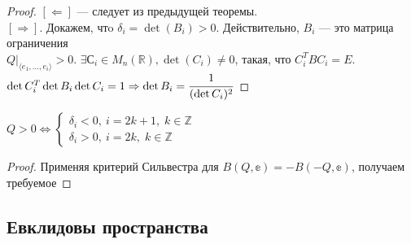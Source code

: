 \begin{proof}
	$[\Leftarrow]$ --- следует из предыдущей теоремы. \\
	$[\Rightarrow]$. Докажем, чтo $\delta_i = \det(B_i) > 0$. Действительно, $B_i$ --- это матрица ограничения\\ $Q\bigr|_{\langle e_1, \ldots, e_i\rangle} > 0$. $\exists С_i \in M_n(\mathbb{R}), \det(C_i) \neq 0$, такая, что $C_i^TBC_i = E$. \\
	$\det C^T_i\det B_i \det C_i = 1 \Rightarrow \det B_i = \cfrac{1}{(\det C_i)^2}$
\end{proof}
\begin{Theorem}
	 $Q > 0 \Leftrightarrow \begin{cases}
		\delta_i < 0,\ i = 2k + 1,\; k\in \mathbb{Z}\\
		\delta_i > 0,\ i = 2k,\; k \in \mathbb{Z}
	\end{cases}$
\end{Theorem}
\begin{proof}
	Применяя критерий Сильвестра для $B(Q, \mathbb{e}) = - B(-Q, \mathbb{e})$, получаем требуемое
\end{proof}
\subsection*{Евклидовы пространства}

